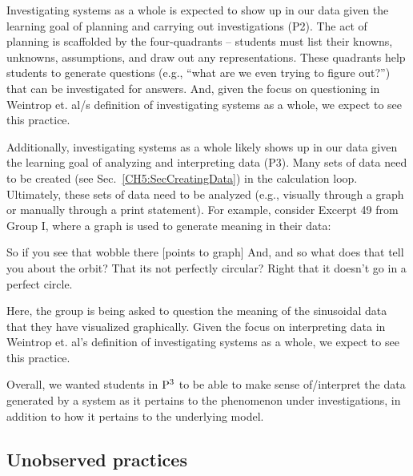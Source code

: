 \documentclass{msuphddissertation}
\begin{document}
\begin{doublespace}
Investigating systems as a whole is expected to show up in our data given the learning goal of planning and carrying out investigations (P2).  The act of planning is scaffolded by the four-quadrants -- students must list their knowns, unknowns, assumptions, and draw out any representations.  These quadrants help students to generate questions (e.g., ``what are we even trying to figure out?'') that can be investigated for answers.  And, given the focus on questioning in Weintrop et. al/s definition of investigating systems as a whole, we expect to see this practice.

Additionally, investigating systems as a whole likely shows up in our data given the learning goal of analyzing and interpreting data (P3).  Many sets of data need to be created (see Sec.~\ref{CH5:SecCreatingData}) in the calculation loop.  Ultimately, these sets of data need to be analyzed (e.g., visually through a graph or manually through a print statement).  For example, consider Excerpt 49 from Group I, where a graph is used to generate meaning in their data:  \begin{description}
\TA So if you see that wobble there [points to graph]
\TA And, and so what does that tell you about the orbit?
\SB That its not perfectly circular?
\SC Right that it doesn't go in a perfect circle.
\end{description}  Here, the group is being asked to question the meaning of the sinusoidal data that they have visualized graphically.  Given the focus on interpreting data in Weintrop et. al's definition of investigating systems as a whole, we expect to see this practice.


Overall, we wanted students in ${\rm P}^{3}$ to be able to make sense of/interpret the data generated by a system as it pertains to the phenomenon under investigations, in addition to how it pertains to the underlying model.

%
%
%
%
%
%
%
%
%
%
%
%
%
%
%
%

\subsection{Unobserved practices}


\end{doublespace}
\end{document}
